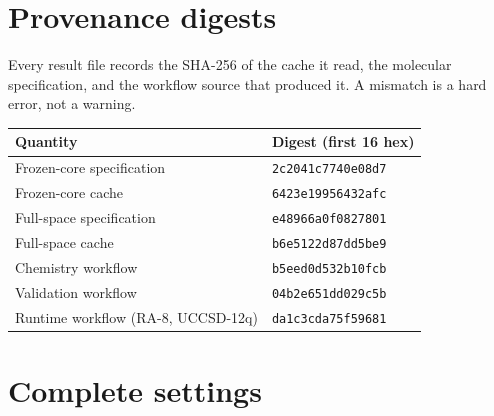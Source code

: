 \documentclass[11pt,a4paper]{article}
\newcommand{\code}[1]{\texttt{\small #1}}
\begin{document}
\appendix

\section{Provenance digests}

Every result file records the SHA-256 of the cache it read, the molecular
specification, and the workflow source that produced it. A mismatch is a hard
error, not a warning.

\begin{center}
\small
\begin{tabular}{ll}
\toprule
Quantity & Digest (first 16 hex) \\
\midrule
Frozen-core specification  & \code{2c2041c7740e08d7} \\
Frozen-core cache          & \code{6423e19956432afc} \\
Full-space specification   & \code{e48966a0f0827801} \\
Full-space cache           & \code{b6e5122d87dd5be9} \\
Chemistry workflow         & \code{b5eed0d532b10fcb} \\
Validation workflow        & \code{04b2e651dd029c5b} \\
Runtime workflow (RA-8, UCCSD-12q) & \code{da1c3cda75f59681} \\
\bottomrule
\end{tabular}
\end{center}

\section{Complete settings}
\end{document}
